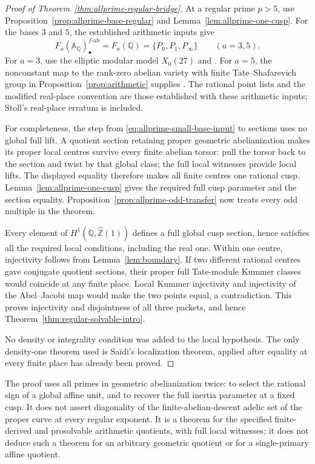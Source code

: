 \begin{proof}[Proof of Theorem~\ref{thm:allprime-regular-bridge}]
At a regular prime \(p>5\), use
Proposition~\ref{prop:allprime-base-regular} and
Lemma~\ref{lem:allprime-one-cusp}.
For the bases \(3\) and \(5\), the established arithmetic
inputs give
\begin{equation}
 F_a(\mathbb A_{\mathbb Q})_\bullet^{f\text{-}\mathrm{ab}}
       =F_a(\mathbb Q)
       =\{P_0,P_1,P_\infty\}\qquad(a=3,5).
 \label{eq:allprime-small-base-input}
\end{equation}
For \(a=3\), use the elliptic modular model \(X_0(27)\) and
\citet[Corollary~8.8, together with Theorem~8.6]{Stoll2007}.
For \(a=5\), the nonconstant map to the rank-zero abelian
variety with finite Tate--Shafarevich group in
Proposition~\ref{prop:arithmetic} supplies
\citet[Theorem~8.6, p.~385]{Stoll2007}.
The rational point lists and the modified real-place
convention are those established with these arithmetic
inputs; Stoll's real-place erratum is included.

For completeness, the step from
\eqref{eq:allprime-small-base-input} to sections uses no global
full lift.
A quotient section retaining proper geometric abelianization
makes its proper local centres survive every finite abelian
torsor: pull the torsor back to the section and twist by that
global class; the full local witnesses provide local lifts.
The displayed equality therefore makes all finite centres one
rational cusp.
Lemma~\ref{lem:allprime-one-cusp} gives the required full cusp
parameter and the section equality.
Proposition~\ref{prop:allprime-odd-transfer} now treats every
odd multiple in the theorem.

Every element of
\(H^1(\mathbb Q,\widehat{\mathbb Z}(1))\) defines a full
global cusp section, hence satisfies all the required local
conditions, including the real one.
Within one centre, injectivity follows from
Lemma~\ref{lem:boundary}.
If two different rational centres gave conjugate quotient
sections, their proper full Tate-module Kummer classes would
coincide at any finite place.
Local Kummer injectivity and injectivity of the Abel--Jacobi
map would make the two points equal, a contradiction.
This proves injectivity and disjointness of all three packets,
and hence Theorem~\ref{thm:regular-solvable-intro}.

No density or integrality condition was added to the local
hypothesis.  The only density-one theorem used is Sa\"idi's
localization theorem, applied after equality at every finite
place has already been proved.
\end{proof}

\begin{remark}
\label{rem:allprime-bridge-scope}
The proof uses all primes in geometric abelianization twice:
to select the rational sign of a global affine unit, and to
recover the full inertia parameter at a fixed cusp.
It does not assert diagonality of the finite-abelian-descent adelic set of the
proper curve at every regular exponent.
It is a theorem for the specified finite-derived and
prosolvable arithmetic quotients, with full local witnesses;
it does not deduce such a theorem for an arbitrary geometric
quotient or for a single-primary affine quotient.
\end{remark}
